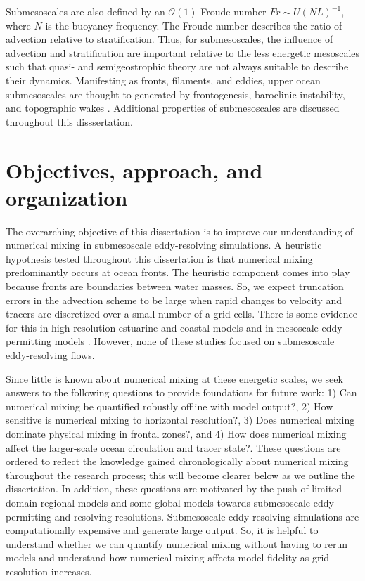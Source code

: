 Submesoscales are also defined by an $\mathcal{O}(1)$ Froude number $Fr \sim U(NL)^{-1}$, where $N$ is the buoyancy frequency. The Froude number describes the ratio of advection relative to stratification. Thus, for submesoscales, the influence of advection and stratification are important relative to the less energetic mesoscales such that quasi- and semigeostrophic theory are not always suitable to describe their dynamics. Manifesting as fronts, filaments, and eddies, upper ocean submesoscales are thought to generated by frontogenesis, baroclinic instability, and topographic wakes \citep{mcwilliams2019survey, taylor2023submesoscale}. Additional properties of submesoscales are discussed throughout this disssertation. 

\section{Objectives, approach, and organization} \label{sec:diss_obj}
The overarching objective of this dissertation is to improve our understanding of numerical mixing in submesoscale eddy-resolving simulations. A heuristic hypothesis tested throughout this dissertation is that numerical mixing predominantly occurs at ocean fronts. The heuristic component comes into play because fronts are boundaries between water masses. So, we expect truncation errors in the advection scheme to be large when rapid changes to velocity and tracers are discretized over a small number of a grid cells. There is some evidence for this in high resolution estuarine and coastal models \citep{Broatch_2022, Kalra_2019, Ralston_2017, wang2021structure} and in mesoscale eddy-permitting models \citep{Holmes_2021, megann2022assessment}. However, none of these studies focused on submesoscale eddy-resolving flows. 

Since little is known about numerical mixing at these energetic scales, we seek answers to the following questions to provide foundations for future work: 1) Can numerical mixing be quantified robustly offline with model output?, 2) How sensitive is numerical mixing to horizontal resolution?, 3) Does numerical mixing dominate physical mixing in frontal zones?, and 4) How does numerical mixing affect the larger-scale ocean circulation and tracer state?. These questions are ordered to reflect the knowledge gained chronologically about numerical mixing throughout the research process; this will become clearer below as we outline the dissertation. In addition, these questions are motivated by the push of limited domain regional models and some global models towards submesoscale eddy-permitting and resolving resolutions. Submesoscale eddy-resolving simulations are computationally expensive and generate large output. So, it is helpful to understand whether we can quantify numerical mixing without having to rerun models and understand how numerical mixing affects model fidelity as grid resolution increases.

